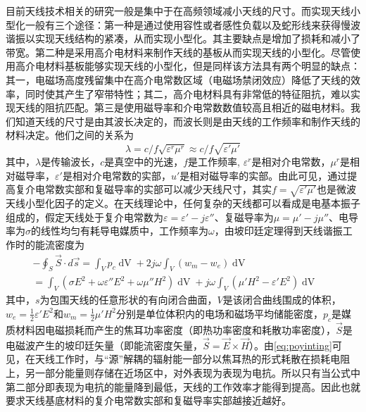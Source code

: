 \documentclass{article}
\newcommand{\tmop}[1]{\ensuremath{\operatorname{#1}}}
\newcommand{\tmstrong}[1]{\textbf{#1}}
\begin{document}
目前天线技术相关的研究一般是集中于在高频领域减小天线的尺寸。而实现天线小型化一般有三个途径：第一种是通过使用容性或者感性负载以及蛇形线来获得慢波谐振以实现天线结构的紧凑，从而实现小型化。其主要缺点是增加了损耗和减小了带宽。第二种是采用高介电材料来制作天线的基板从而实现天线的小型化。尽管使用高介电材料基板能够实现天线的小型化，但是同样该方法具有两个明显的缺点：其一，电磁场高度残留集中在高介电常数区域（电磁场禁闭效应）降低了天线的效率，同时使其产生了窄带特性；其二，高介电材料具有非常低的特征阻抗，难以实现天线的阻抗匹配。第三是使用磁导率和介电常数数值较高且相近的磁电材料。我们知道天线的尺寸是由其波长决定的，而波长则是由天线的工作频率和制作天线的材料决定。他们之间的关系为
\begin{equation}
  \label{eq:light} \lambda = c / f \sqrt{\varepsilon^r \mu^r} \approx c / f
  \sqrt{\varepsilon' \mu'}
\end{equation}
其中，$\lambda$是传输波长，$c$是真空中的光速，$f$是工作频率,
$\varepsilon^r$是相对介电常数，$\mu^r$是相对磁导率，$\varepsilon'$是相对介电常数的实部，$u'$是相对磁导率的实部。由此可见，通过提高复介电常数实部和复磁导率的实部可以减少天线尺寸，其实{\tmstrong{$f
= \sqrt{\varepsilon'
\mu'}$}}也是微波天线小型化因子的定义。在天线理论中，任何复杂的天线都可以看成是电基本振子组成的，假定天线处于复介电常数为$\varepsilon
= \varepsilon' - j \varepsilon''$、复磁导率为$\mu = \mu' - j
\mu''$、电导率为$\sigma$的线性均匀有耗导电媒质中，工作频率为$\omega$，由坡印廷定理得到天线谐振工作时的能流密度为
\begin{eqnarray}
  \label{eq:poyinting} - \oint_S \vec{S} \cdot d \vec{s} = \int_V p_c
  \tmop{dV} + 2 j \omega \int_V \left( w_m - w_e \right) \tmop{dV} &  & 
  \nonumber\\
  = \int_V \left( \sigma E^2 + \omega \varepsilon'' E^2 + \omega \mu'' H^2
  \right) \tmop{dV} + j \omega \int_V \left( \mu' H^2 - \varepsilon' E^2
  \right) \tmop{dV} &  & 
\end{eqnarray}
其中，$s$为包围天线的任意形状的有向闭合曲面，$V$是该闭合曲线围成的体积，$w_e
= \frac{1}{2} \varepsilon' E^2$和$w_m = \frac{1}{2} \mu'
H^2$分别是单位体积内的电场和磁场平均储能密度，$p_c$是媒质材料因电磁损耗而产生的焦耳功率密度（即热功率密度和耗散功率密度），$\vec{S}$是电磁波产生的坡印廷矢量（即能流密度矢量，$\vec{S}
= \overrightarrow{E} \times
\vec{H}$）。由\ref{eq:poyinting}可见，在天线工作时，与“源”解耦的辐射能一部分以焦耳热的形式耗散在损耗电阻上，另一部分能量则存储在近场区中，对外表现为表现为电抗。所以只有当公式中第二部分即表现为电抗的能量降到最低，天线的工作效率才能得到提高。因此也就要求天线基底材料的复介电常数实部和复磁导率实部越接近越好。
\end{document}
